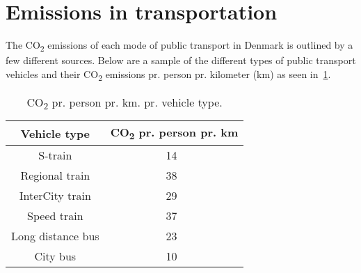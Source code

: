 \section{Emissions in transportation}\label{sec:emissions-in-transportation}

The \unit{CO_{2}} emissions of each mode of public transport in Denmark is outlined by a few different sources.
Below are a sample of the different types of public transport vehicles and their \unit{CO_{2}} emissions pr. person
pr. kilometer (km) as seen in~\ref{tab:emissions}.

\begin{table}
    \centering
    \begin{tabular}{|c|c|}
        \hline
        Vehicle type & \unit{CO_{2}} pr. person pr. km \\
        \hline
        S-train & 14~\cite{dsb2023} \\
        Regional train & 38~\cite{dsb2023} \\
        InterCity train & 29~\cite{dsb2023} \\
        Speed train & 37~\cite{dsb2023} \\
        Long distance bus & 23~\cite{cowi2022} \\
        City bus & 10~\cite{ntm2023} \\
        \hline
    \end{tabular}
    \caption{\unit{CO_{2}} pr. person pr. km. pr. vehicle type.}
    \label{tab:emissions}
\end{table}
